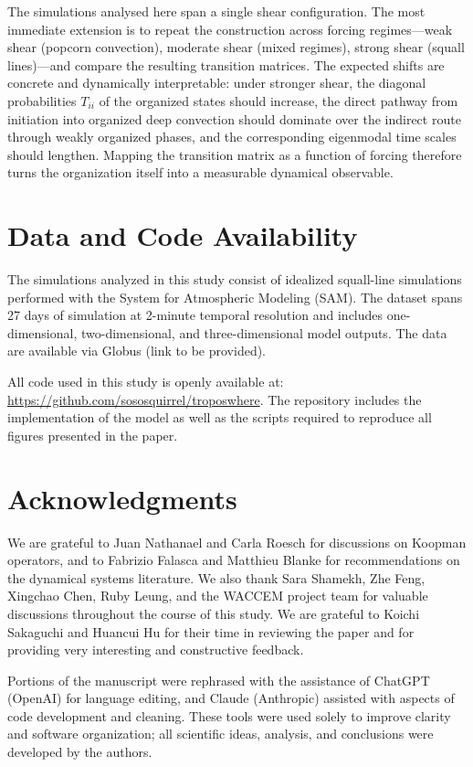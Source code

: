 \documentclass[11pt]{article}
\begin{document}
The simulations analysed here span a single shear configuration. The most immediate extension is to repeat the construction across forcing regimes---weak shear (popcorn convection), moderate shear (mixed regimes), strong shear (squall lines)---and compare the resulting transition matrices. The expected shifts are concrete and dynamically interpretable: under stronger shear, the diagonal probabilities $T_{ii}$ of the organized states should increase, the direct pathway from initiation into organized deep convection should dominate over the indirect route through weakly organized phases, and the corresponding eigenmodal time scales should lengthen. Mapping the transition matrix as a function of forcing therefore turns the organization itself into a measurable dynamical observable.



\section{Data and Code Availability}

The simulations analyzed in this study consist of idealized squall-line simulations performed with the System for Atmospheric Modeling (SAM). The dataset spans 27 days of simulation at 2-minute temporal resolution and includes one-dimensional, two-dimensional, and three-dimensional model outputs. The data are available via Globus (link to be provided).

All code used in this study is openly available at: \url{https://github.com/sososquirrel/troposwhere}. The repository includes the implementation of the model as well as the scripts required to reproduce all figures presented in the paper.

\section{Acknowledgments}

We are grateful to Juan Nathanael and Carla Roesch for discussions on Koopman operators, and to Fabrizio Falasca and Matthieu Blanke for recommendations on the dynamical systems literature. We also thank Sara Shamekh, Zhe Feng, Xingchao Chen, Ruby Leung, and the WACCEM project team for valuable discussions throughout the course of this study. We are grateful to Koichi Sakaguchi and Huancui Hu for their time in reviewing the paper and for providing very interesting and constructive feedback.

Portions of the manuscript were rephrased with the assistance of ChatGPT (OpenAI) for language editing, and Claude (Anthropic) assisted with aspects of code development and cleaning. These tools were used solely to improve clarity and software organization; all scientific ideas, analysis, and conclusions were developed by the authors.
\end{document}
